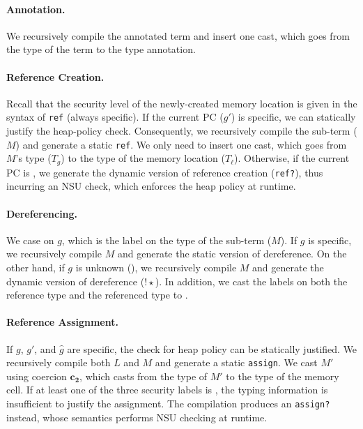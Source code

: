 \paragraph{Annotation.}
We recursively compile the annotated term and insert one cast, which goes from
the type of the term to the type annotation.

\paragraph{Reference Creation.}
Recall that the security level of the newly-created memory location is given in
the syntax of \texttt{ref} (always specific). If the current PC ($g'$) is
specific, we can statically justify the heap-policy check. Consequently, we
recursively compile the sub-term ($M$) and generate a static \texttt{ref}. We
only need to insert one cast, which goes from $M$'s type ($T_g$) to the type of
the memory location ($T_{\ell}$). Otherwise, if the current PC is \unk, we
generate the dynamic version of reference creation (\texttt{ref?}), thus
incurring an NSU check, which enforces the heap policy at runtime.

\paragraph{Dereferencing.}
We case on $g$, which is the label on the type of the sub-term ($M$). If $g$ is
specific, we recursively compile $M$ and generate the static version of
dereference. On the other hand, if $g$ is unknown (\unk), we recursively compile
$M$ and generate the dynamic version of dereference ($\mathtt{!}{\star}$). In
addition, we cast the labels on both the reference type and the referenced type
to \unk.

\paragraph{Reference Assignment.}
If $g$, $g'$, and $\hat{g}$ are specific, the check for heap policy can be
statically justified. We recursively compile both $L$ and $M$ and generate a
static \texttt{assign}. We cast $M'$ using coercion $\bm{c_2}$, which casts from
the type of $M'$ to the type of the memory cell. If at least one of the three
security labels is \unk, the typing information is insufficient to justify the
assignment. The compilation produces an \texttt{assign?} instead, whose
semantics performs NSU checking at runtime.

